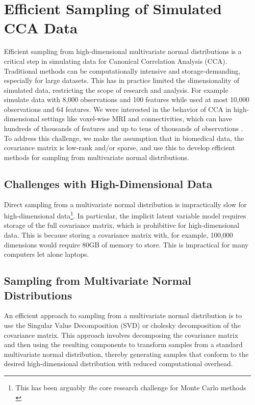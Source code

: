 \section{Efficient Sampling of Simulated CCA Data}\label{sec:efficient}

Efficient sampling from high-dimensional multivariate normal distributions is a critical step in simulating data for Canonical Correlation Analysis (CCA). Traditional methods can be computationally intensive and storage-demanding, especially for large datasets.
This has in practice limited the dimensionality of simulated data, restricting the scope of research and analysis.
For example \citet{matkovic2023contribution} simulate data with 8,000 observations and 100 features while \citet{helmer2020stability} used at most 10,000 observations and 64 features.
We were interested in the behavior of CCA in high-dimensional settings like voxel-wise MRI and connectivities, which can have hundreds of thousands of features \citep{jack2008alzheimer} and up to tens of thousands of observations \citep{sudlow2015uk}.
To address this challenge, we make the assumption that in biomedical data, the covariance matrix is low-rank and/or sparse, and use this to develop efficient methods for sampling from multivariate normal distributions.

\subsection{Challenges with High-Dimensional Data}
Direct sampling from a multivariate normal distribution is impractically slow for high-dimensional data\footnote{This has been arguably \textit{the} core research challenge for Monte Carlo methods \citep{mackay1998introduction}}.
In particular, the implicit latent variable model requires storage of the full covariance matrix, which is prohibitive for high-dimensional data.
This is because storing a covariance matrix with, for example, 100,000 dimensions would require 80GB of memory to store.
This is impractical for many computers let alone laptops.

\subsection{Sampling from Multivariate Normal Distributions}
An efficient approach to sampling from a multivariate normal distribution is to use the Singular Value Decomposition (SVD) or cholesky decomposition of the covariance matrix.
This approach involves decomposing the covariance matrix and then using the resulting components to transform samples from a standard multivariate normal distribution, thereby generating samples that conform to the desired high-dimensional distribution with reduced computational overhead.

